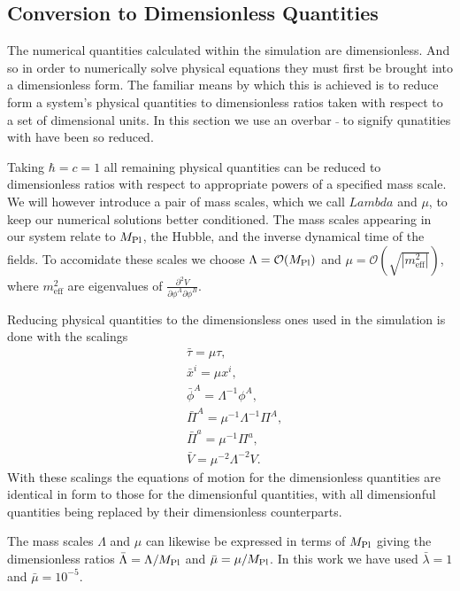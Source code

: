 

\subsection{Conversion to Dimensionless Quantities}
The numerical quantities calculated within the simulation are dimensionless. And so in order to numerically solve physical equations they must first be brought into a dimensionless form. The familiar means by which this is achieved is to reduce form a system's physical quantities to dimensionless ratios taken with respect to a set of dimensional units. In this section we use an overbar $\bar{}$ to signify qunatities with have been so reduced.

Taking $\hbar=c=1$ all remaining physical quantities can be reduced to dimensionless ratios with respect to appropriate powers of a specified mass scale. We will however introduce a pair of mass scales, which we call $Lambda$ and $\mu$, to keep our numerical solutions better conditioned. The mass scales appearing in our system relate to $M_{\mathrm{Pl}}$, the Hubble, and the inverse dynamical time of the fields. To accomidate these scales we choose $\Lambda = \mathcal{O}(M_{\mathrm{Pl}})$ and $\mu = \mathcal{O}(\sqrt{|m^2_\mathrm{eff}|})$, where $m^2_\mathrm{eff}$ are eigenvalues of $\frac{\partial^2 V}{\partial\phi^A\partial\phi^B}$.

Reducing physical quantities to the dimensionsless ones used in the simulation is done with the scalings
\begin{align}
  & \bar{\tau} = \mu\tau, \\
  & \bar{x}^i = \mu x^i, \\ 
  & \bar{\phi}^A = \Lambda^{-1}\phi^A, \\
  & \bar{\Pi}^A = \mu^{-1}\Lambda^{-1}\Pi^A, \\
  & \bar{\Pi}^a = \mu^{-1}\Pi^a, \\
  & \bar{V} = \mu^{-2}\Lambda^{-2}V.
\end{align}
With these scalings the equations of motion for the dimensionless quantities are identical in form to those for the dimensionful quantities, with all dimensionful quantities being replaced by their dimensionless counterparts.

The mass scales $\Lambda$ and $\mu$ can likewise be expressed in terms of $M_{\mathrm{Pl}}$ giving the dimensionless ratios $\bar{\Lambda} = \Lambda/M_{\mathrm{Pl}}$ and $\bar{\mu} = \mu/M_{\mathrm{Pl}}$. In this work we have used $\bar{\lambda} = 1$ and $\bar{\mu} = 10^{-5}$.
